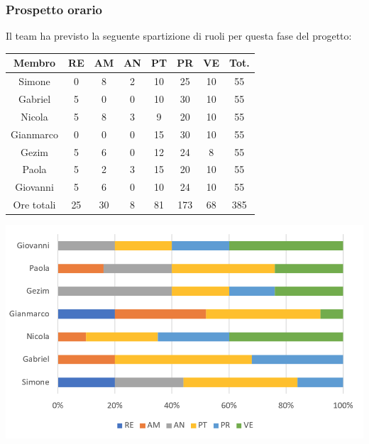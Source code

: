 \subsubsection{Prospetto orario}
Il team ha previsto la seguente spartizione di ruoli per questa fase del progetto:
\\
\begin{center}
\begin{tabular}{ |c|c|c|c|c|c|c|c|  }
 \hline
 Membro 		& RE 	& AM 	& AN 	& PT 	& PR 	& VE 	& Tot.\\
 \hline\hline
 Simone			& 0 		& 8		& 2 	& 10 	& 25 		& 10 		& 55\\
 Gabriel		& 5 		& 0 		& 0 	& 10		& 30 		& 10 		& 55\\
 Nicola			& 5 		& 8 		& 3 	& 9 		& 20 		& 10 		& 55\\
 Gianmarco		& 0 		& 0 		& 0 	& 15 	& 30 		& 10 		& 55\\
 Gezim			& 5 		& 6 		& 0 	& 12 		& 24 		& 8	 	& 55\\
 Paola			& 5 		& 2 		& 3 	& 15 		& 20 		& 10 		& 55\\
 Giovanni		& 5 		& 6	 	& 0 	& 10 		& 24 		& 10  	& 55\\
 \hline\hline
 Ore totali		& 25		& 30		& 8 	& 81	 	& 173 	& 68 	& 385\\
  \hline
\end{tabular}
\end{center}
\includegraphics[width=\textwidth]{res/img/hi33}
\\
